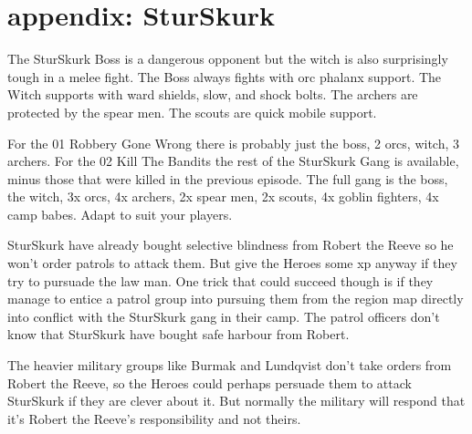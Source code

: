 \newpage
\section*{appendix: SturSkurk}

\raggedbottom

The SturSkurk Boss is a dangerous opponent but the witch is also surprisingly tough in a melee fight. The Boss always fights with orc phalanx support. The Witch supports with ward shields, slow, and shock bolts. The archers are protected by the spear men. The scouts are quick mobile support.

For the 01 Robbery Gone Wrong there is probably just the boss, 2 orcs, witch, 3 archers. For the 02 Kill The Bandits the rest of the SturSkurk Gang is available, minus those that were killed in the previous episode. The full gang is the boss, the witch, 3x orcs, 4x archers, 2x spear men, 2x scouts, 4x goblin fighters, 4x camp babes. Adapt to suit your players.

SturSkurk have already bought selective blindness from Robert the Reeve so he won't order patrols to attack them. But give the Heroes some xp anyway if they try to pursuade the law man. One trick that could succeed though is if they manage to entice a patrol group into pursuing them from the region map directly into conflict with the SturSkurk gang in their camp. The patrol officers don't know that SturSkurk have bought safe harbour from Robert.

The heavier military groups like Burmak and Lundqvist don't take orders from Robert the Reeve, so the Heroes could perhaps persuade them to attack SturSkurk if they are clever about it. But normally the military will respond that it's Robert the Reeve's responsibility and not theirs.



